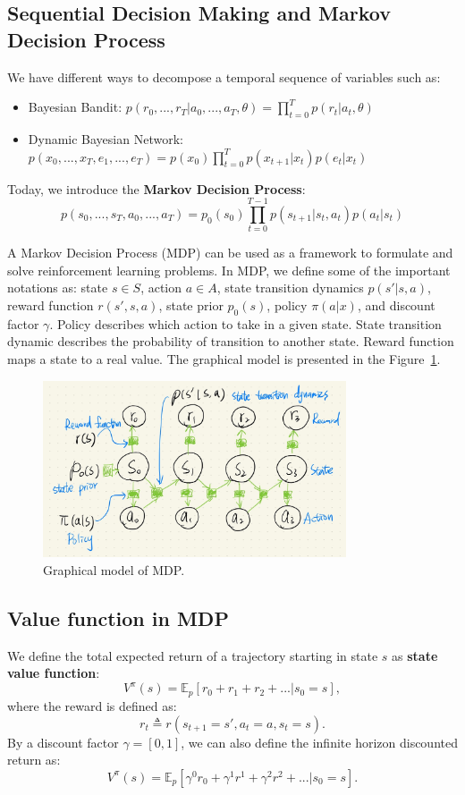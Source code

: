 \documentclass[11pt]{article}
\begin{document}
\subsection{Sequential Decision Making and Markov Decision Process}
We have different ways to decompose a temporal sequence of variables such as:
\vspace{-5mm}
\begin{itemize}\itemsep -2pt
    \item Bayesian Bandit:
    $p(r_0,...,r_T|a_0,...,a_T,\theta) = \prod_{t=0}^{T} p(r_t|a_t,\theta)$
    \item Dynamic Bayesian Network:
    $p(x_0,...,x_T,e_1,...,e_T) = p(x_0)\prod_{t=0}^{T} p(x_{t+1}|x_t)p(e_t|x_t)$
\end{itemize}
Today, we introduce the \textbf{Markov Decision Process}:
$$p(s_0,...,s_T,a_0,...,a_T) = p_0(s_0) \prod_{t=0}^{T-1} p(s_{t+1}|s_t,a_t)p(a_t|s_t)$$

A Markov Decision Process (MDP) can be used as a framework to formulate and solve reinforcement learning problems. In MDP, we define some of the important notations as: state $s\in S$, action $a \in A$, state transition dynamics $p(s'|s,a)$, reward function $r(s',s,a)$, state prior $p_0(s)$, policy $\pi(a|x)$, and discount factor $\gamma$. Policy describes which action to take in a given state. State transition dynamic describes the probability of transition to another state. Reward function maps a state to a real value. The graphical model is presented in the Figure~\ref{fig:MDPgraph}.

\begin{figure}[H]
    \centering
    \includegraphics[width=0.8\textwidth]{Img/MDP_graph.jpg}
    \caption{Graphical model of MDP.}
    \label{fig:MDPgraph}
\end{figure}

\subsection{Value function in MDP}\label{sec:mdp_value}
We define the total expected return of a trajectory starting in state $s$ as \textbf{state value function}:
$$V^{\pi}(s) = \mathbb{E}_p [r_0+r_1+r_2+...|s_0=s],$$
where the reward is defined as:
$$r_t \triangleq r(s_{t+1}=s',a_t=a,s_t=s).$$
By a discount factor $\gamma = [0,1]$, we can also define the infinite horizon discounted return as:
$$V^{\pi}(s) = \mathbb{E}_p [\gamma^0 r_0 + \gamma^1 r^1+\gamma^2 r^2+...|s_0=s].$$
\end{document}
